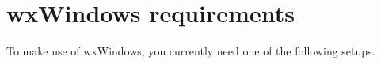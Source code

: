 \begin{comment}
\section{Changes from version 2.0}\label{versionchanges20}

These are a few of the differences between versions 2.0 and 2.2.

Removals:

\begin{itemize}\itemsep=0pt
\item GTK 1.0 no longer supported.
\end{itemize}

Additions and changes:

\begin{itemize}\itemsep=0pt
\item Corrected many classes to conform better to documented behaviour.
\item Added handlers for more image formats (Now GIF, JPEG, PCX, BMP, XPM, PNG, PNM).
\item Improved support for socket and network functions.
\item Support for different national font encodings.
\item Sizer based layout system.
\item HTML widget and help system.
\item Added some controls (e.g. wxSpinCtrl) and supplemented many.
\item Many optical improvements to GTK port.
\item Support for menu accelerators in GTK port.
\item Enhanced and improved support for scrolling, including child windows.
\item Complete rewrite of clipboard and drag and drop classes.
\item Improved support for ODBC databases.
\item Improved tab traversal in dialogs.
\end{itemize}
\end{comment}

\section{wxWindows requirements}\label{requirements}

To make use of wxWindows, you currently need one of the following setups.

